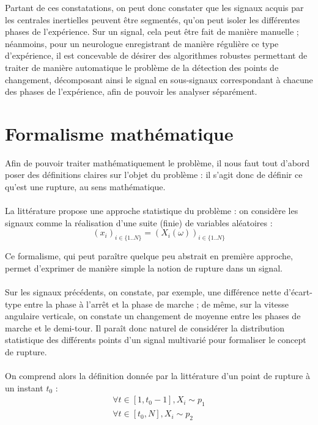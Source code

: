 \documentclass[french,12pt,notitlepage]{report}
\begin{document}
	\vspace{1pc}

	Partant de ces constatations, on peut donc constater que les signaux acquis par les centrales inertielles peuvent être segmentés, qu'on peut isoler les différentes phases de l'expérience. Sur un signal, cela peut être fait de manière manuelle ; néanmoins, pour un neurologue enregistrant de manière régulière ce type d'expérience, il est concevable de désirer des algorithmes robustes permettant de traiter de manière automatique le problème de la détection des points de changement, décomposant ainsi le signal en sous-signaux correspondant à chacune des phases de l'expérience, afin de pouvoir les analyser séparément.

	\section{Formalisme mathématique}
	Afin de pouvoir traiter mathématiquement le problème, il nous faut tout d'abord poser des définitions claires sur l'objet du problème : il s'agit donc de définir ce qu'est une rupture, au sens mathématique.
	\\ \\
	La littérature propose une approche statistique du problème : on considère les signaux comme la réalisation d'une suite (finie) de variables aléatoires :
	\begin{equation}
		(x_i)_{i \in \{1..N\}} = (X_i(\omega))_{i \in \{1..N\}}
		\label{11}
	\end{equation}

	Ce formalisme, qui peut paraître quelque peu abstrait en première approche, permet d'exprimer de manière simple la notion de rupture dans un signal.
	\\ \\
	Sur les signaux précédents, on constate, par exemple, une différence nette d'écart-type entre la phase à l'arrêt et la phase de marche ; de même, sur la vitesse angulaire verticale, on constate un changement de moyenne entre les phases de marche et le demi-tour. Il paraît donc naturel de considérer la distribution statistique des différents points d'un signal multivarié pour formaliser le concept de rupture.
	\\ \\
	On comprend alors la définition donnée par la littérature d'un point de rupture à un instant $t_0$ :
	\begin{equation}
	\begin{array}{ll}
			\forall t \in [1, t_0-1], X_i \sim p_1 \\
			 \forall t \in [t_0, N], X_i \sim p_2 \\
	\end{array}
	\end{equation}
\end{document}
